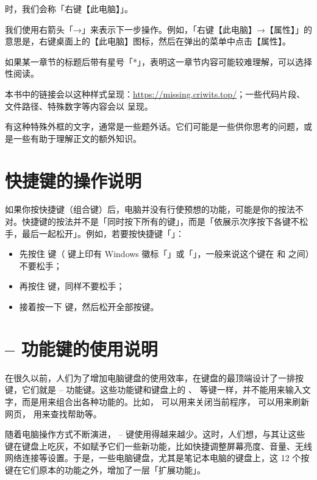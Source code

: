 \noindent 时，我们会称「右键【此电脑】」。

我们使用右箭头「→」来表示下一步操作。例如，「右键【此电脑】→【属性】」的意思是，右键桌面上的【此电脑】图标，然后在弹出的菜单中点击【属性】。

如果某一章节的标题后带有星号「*」，表明这一章节内容可能较难理解，可以选择性阅读。

本书中的链接会以这种样式呈现：\url{https://missing.criwits.top/}；一些代码片段、文件路径、特殊数字等内容会以  呈现。

\begin{note}
  有这种特殊外框的文字，通常是一些题外话。它们可能是一些供你思考的问题，或是一些有助于理解正文的额外知识。
\end{note}

\section{快捷键的操作说明}

如果你按快捷键（组合键）后，电脑并没有行使预想的功能，可能是你的按法不对。快捷键的按法并不是「同时按下所有的键」，而是「依展示次序按下各键不松手，最后一起松开」。例如，若要按快捷键「」：

\begin{itemize}
  \item 先按住 \keys{\Windows} 键（\keys{\Windows} 键上印有 Windows 徽标「\Windows」或「\WindowsTen」，一般来说这个键在  和  之间）不要松手；
  \item 再按住  键，同样不要松手；
  \item 接着按一下  键，然后松开全部按键。
\end{itemize}

\section{ --  功能键的使用说明}

在很久以前，人们为了增加电脑键盘的使用效率，在键盘的最顶端设计了一排按键，它们就是  --  功能键。这些功能键和键盘上的 、 等键一样，并不能用来输入文字，而是用来组合出各种功能的。比如， 可以用来关闭当前程序， 可以用来刷新网页， 用来查找帮助等。

随着电脑操作方式不断演进， --  键使用得越来越少。这时，人们想，与其让这些键在键盘上吃灰，不如赋予它们一些新功能，比如快捷调整屏幕亮度、音量、无线网络连接等设置。于是，一些电脑键盘，尤其是笔记本电脑的键盘上，这 12 个按键在它们原本的功能之外，增加了一层「扩展功能」。


